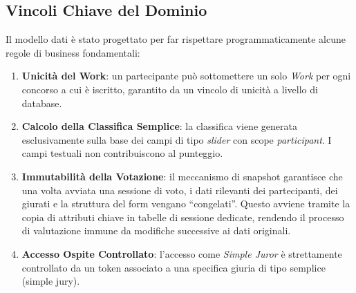 \subsection{Vincoli Chiave del Dominio}\label{subsec:vincoli-chiave-del-dominio}
Il modello dati è stato progettato per far rispettare programmaticamente alcune regole di business fondamentali:
\begin{enumerate}
    \item \textbf{Unicità del Work}: un partecipante può sottomettere un solo \emph{Work} per ogni concorso a cui è iscritto, garantito da un vincolo di unicità a livello di database.
    \item \textbf{Calcolo della Classifica Semplice}: la classifica viene generata esclusivamente sulla base dei campi di tipo \emph{slider} con scope \emph{participant}.
    I campi testuali non contribuiscono al punteggio.
    \item \textbf{Immutabilità della Votazione}: il meccanismo di snapshot garantisce che una volta avviata una sessione di voto, i dati rilevanti dei partecipanti, dei giurati e la struttura del form vengano ``congelati''.
    Questo avviene tramite la copia di attributi chiave in tabelle di sessione dedicate, rendendo il processo di valutazione immune da modifiche successive ai dati originali.
    \item \textbf{Accesso Ospite Controllato}: l'accesso come \emph{Simple Juror} è strettamente controllato da un token associato a una specifica giuria di tipo semplice (simple jury).
\end{enumerate}